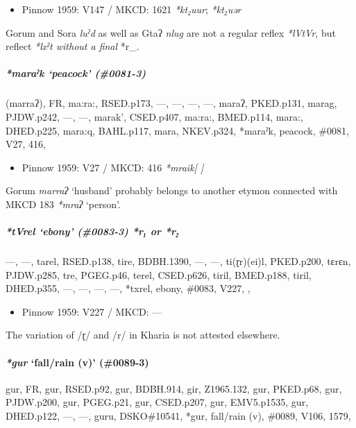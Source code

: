 \documentclass[a4paper,]{article}
\providecommand{\tightlist}{%
  \setlength{\itemsep}{0pt}\setlength{\parskip}{0pt}}
\let\oldparagraph\paragraph
\renewcommand{\paragraph}[1]{\oldparagraph{#1}\mbox{}}
\let\oldsubparagraph\subparagraph
\renewcommand{\subparagraph}[1]{\oldsubparagraph{#1}\mbox{}}
\begin{document}
\begin{itemize}
\tightlist
\item
  Pinnow 1959: V147 / MKCD: 1621 \emph{*kt₂uur}; \emph{*kt₂uər}
\end{itemize}

Gorum and Sora \emph{luˀd} as well as Gtaʔ \emph{nlug} are not a regular
reflex \emph{*lVtVr}, but reflect \emph{*lxˀt without a final }*r\_.

\subparagraph{\texorpdfstring{\emph{*maraˀk} `peacock'
(\#0081-3)}{*maraˀk peacock (\#0081-3)}}\label{maraux2c0k-peacock-0081-3}

(marraʔ), FR, ma:ra:, RSED.p173, ---, ---, ---, ---, maraʔ, PKED.p131,
marag, PJDW.p242, ---, ---, marak', CSED.p407, ma:ra:, BMED.p114, mara:,
DHED.p225, mara:q, BAHL.p117, mara, NKEV.p324, *maraˀk, peacock, \#0081,
V27, 416,

\begin{itemize}
\tightlist
\item
  Pinnow 1959: V27 / MKCD: 416 \emph{*mraik{[} {]}}
\end{itemize}

Gorum \emph{marraʔ} `husband' probably belongs to another etymon
connected with MKCD 183 \emph{*mraʔ} `person'.

\subparagraph{\texorpdfstring{\emph{*tVrel} `ebony' (\#0083-3)
\emph{*r₁} or
\emph{*r₂}}{*tVrel ebony (\#0083-3) *r₁ or *r₂}}\label{tvrel-ebony-0083-3-r-or-r}

---, ---, tarel, RSED.p138, tire, BDBH.1390, ---, ---, ti(ɽr)(ei)l,
PKED.p200, tɛrɛn, PJDW.p285, tre, PGEG.p46, terel, CSED.p626, tiril,
BMED.p188, tiril, DHED.p355, ---, ---, ---, ---, *txrel, ebony, \#0083,
V227, ,

\begin{itemize}
\tightlist
\item
  Pinnow 1959: V227 / MKCD: ---
\end{itemize}

The variation of /ɽ/ and /r/ in Kharia is not attested elsewhere.

\paragraph{\texorpdfstring{\emph{*gur} `fall/rain (v)'
(\#0089-3)}{*gur fall/rain (v) (\#0089-3)}}\label{gur-fallrain-v-0089-3}

gur, FR, gur, RSED.p92, gur, BDBH.914, gir, Z1965.132, gur, PKED.p68,
gur, PJDW.p200, gur, PGEG.p21, gur, CSED.p207, gur, EMV5.p1535, gur,
DHED.p122, ---, ---, guru, DSKO\#10541, *gur, fall/rain (v), \#0089,
V106, 1579,
\end{document}
